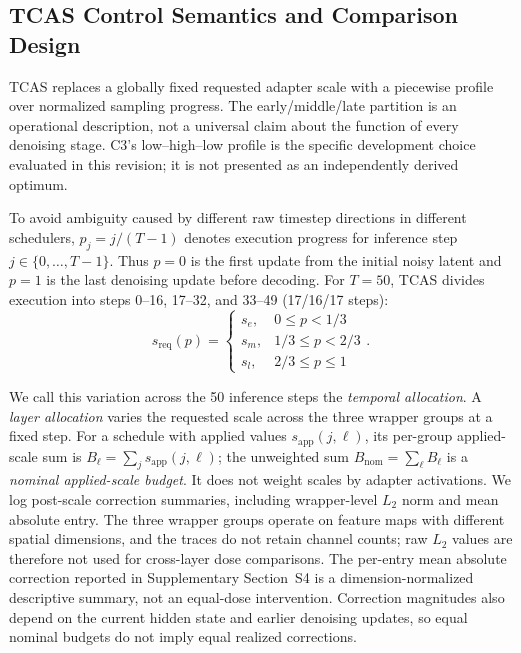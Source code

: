 \documentclass[times,twocolumn,final]{elsarticle}
\begin{document}
\subsection{TCAS Control Semantics and Comparison Design}
\label{subsec:tcas}

TCAS replaces a globally fixed requested adapter scale with a piecewise profile over normalized sampling progress. The early/middle/late partition is an operational description, not a universal claim about the function of every denoising stage. C3's low--high--low profile is the specific development choice evaluated in this revision; it is not presented as an independently derived optimum.

To avoid ambiguity caused by different raw timestep directions in different schedulers, $p_j=j/(T-1)$ denotes execution progress for inference step $j\in\{0,\ldots,T-1\}$. Thus $p=0$ is the first update from the initial noisy latent and $p=1$ is the last denoising update before decoding. For $T=50$, TCAS divides execution into steps 0--16, 17--32, and 33--49 (17/16/17 steps):
\begin{equation}
s_{\mathrm{req}}(p) = \begin{cases} s_e, & 0 \leq p < 1/3 \\ s_m, & 1/3 \leq p < 2/3 \\ s_l, & 2/3 \leq p \leq 1 \end{cases}.
\label{eq:tcas}
\end{equation}

We call this variation across the 50 inference steps the \emph{temporal allocation}. A \emph{layer allocation} varies the requested scale across the three wrapper groups at a fixed step. For a schedule with applied values $s_{\mathrm{app}}(j,\ell)$, its per-group applied-scale sum is $B_\ell=\sum_j s_{\mathrm{app}}(j,\ell)$; the unweighted sum $B_{\mathrm{nom}}=\sum_\ell B_\ell$ is a \emph{nominal applied-scale budget}. It does not weight scales by adapter activations. We log post-scale correction summaries, including wrapper-level $L_2$ norm and mean absolute entry. The three wrapper groups operate on feature maps with different spatial dimensions, and the traces do not retain channel counts; raw $L_2$ values are therefore not used for cross-layer dose comparisons. The per-entry mean absolute correction reported in Supplementary Section~S4 is a dimension-normalized descriptive summary, not an equal-dose intervention. Correction magnitudes also depend on the current hidden state and earlier denoising updates, so equal nominal budgets do not imply equal realized corrections.
\end{document}
